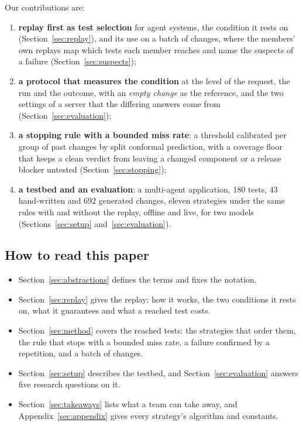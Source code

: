 \documentclass[11pt,a4paper]{article}
\begin{document}
Our contributions are:
\begin{enumerate}
  \item \textbf{replay first as test selection} for agent systems, the condition it rests on
        (Section~\ref{sec:replay}), and its use on a batch of changes, where the members' own replays map which
        tests each member reaches and name the suspects of a failure (Section~\ref{sec:suspects});
  \item \textbf{a protocol that measures the condition} at the level of the request, the run and the outcome,
        with an \emph{empty change} as the reference, and the two settings of a server that the differing answers
        come from (Section~\ref{sec:evaluation});
  \item \textbf{a stopping rule with a bounded miss rate}: a threshold calibrated per group of past changes by
        split conformal prediction, with a coverage floor that keeps a clean verdict from leaving a changed
        component or a release blocker untested (Section~\ref{sec:stopping});
  \item \textbf{a testbed and an evaluation}: a multi-agent application, 180 tests, 43 hand-written and 692
        generated changes, eleven strategies under the same rules with and without the replay, offline and live,
        for two models (Sections~\ref{sec:setup} and~\ref{sec:evaluation}).
\end{enumerate}

\subsection{How to read this paper}

\begin{itemize}
  \item Section~\ref{sec:abstractions} defines the terms and fixes the notation.
  \item Section~\ref{sec:replay} gives the replay: how it works, the two conditions it rests on, what it
        guarantees and what a reached test costs.
  \item Section~\ref{sec:method} covers the reached tests: the strategies that order them, the rule that stops
        with a bounded miss rate, a failure confirmed by a repetition, and a batch of changes.
  \item Section~\ref{sec:setup} describes the testbed, and Section~\ref{sec:evaluation} answers five research
        questions on it.
  \item Section~\ref{sec:takeaways} lists what a team can take away, and Appendix~\ref{sec:appendix} gives every
        strategy's algorithm and constants.
\end{itemize}
\end{document}

